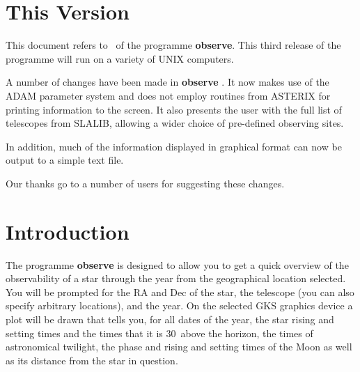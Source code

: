  \begin{latexonly}
   \setlength{\parskip}{0mm}
   \latexonlytoc
   \setlength{\parskip}{\medskipamount}
   \markright{\stardocname}
 \end{latexonly}
\newpage

\section{This Version}
\label{sec:version}

This document refers to \stardocversion\ of the programme {\bf{observe}}.
This third release of the programme will run on a variety of UNIX
computers.

A number of changes have been made in {\bf{observe}} \stardocversion.
It now makes use of the ADAM parameter system and does not employ
routines from {\sc ASTERIX} for printing information to the screen. It
also presents the user with the full list of telescopes from SLALIB,
allowing a wider choice of pre-defined observing sites. 

In addition, much of the information displayed in graphical format 
can now be output to a simple text file.

Our thanks go to a number of users for suggesting these changes.

\section{Introduction}
\label{sec:introduction}

The programme {\bf{observe}} is designed to allow you to get a quick
overview of the observability of a star through the year from the
geographical location selected. You will be prompted for the RA and Dec
of the star, the telescope (you can also specify arbitrary locations),
and the year. On the selected GKS graphics device a plot will be drawn
that tells you, for all dates of the year, the star rising and setting
times and the times that it is 30\degrees\ above the  horizon, the
times of astronomical twilight, the phase and rising and setting  times
of the Moon as well as its distance from the star in question.

